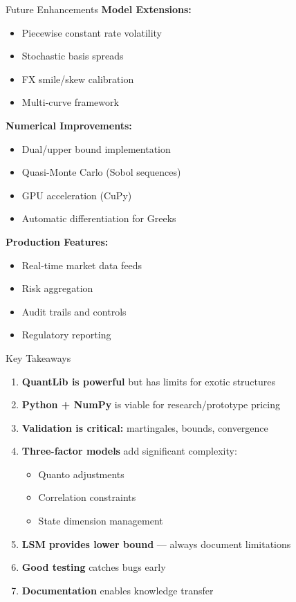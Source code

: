 \documentclass[aspectratio=169,11pt]{beamer}
\begin{document}
\begin{frame}{Future Enhancements}
\textbf{Model Extensions:}
\begin{itemize}
    \item Piecewise constant rate volatility
    \item Stochastic basis spreads
    \item FX smile/skew calibration
    \item Multi-curve framework
\end{itemize}

\textbf{Numerical Improvements:}
\begin{itemize}
    \item Dual/upper bound implementation
    \item Quasi-Monte Carlo (Sobol sequences)
    \item GPU acceleration (CuPy)
    \item Automatic differentiation for Greeks
\end{itemize}

\textbf{Production Features:}
\begin{itemize}
    \item Real-time market data feeds
    \item Risk aggregation
    \item Audit trails and controls
    \item Regulatory reporting
\end{itemize}
\end{frame}

\begin{frame}{Key Takeaways}
\begin{enumerate}
    \item \textbf{QuantLib is powerful} but has limits for exotic structures

    \item \textbf{Python + NumPy} is viable for research/prototype pricing

    \item \textbf{Validation is critical:} martingales, bounds, convergence

    \item \textbf{Three-factor models} add significant complexity:
    \begin{itemize}
        \item Quanto adjustments
        \item Correlation constraints
        \item State dimension management
    \end{itemize}

    \item \textbf{LSM provides lower bound} --- always document limitations

    \item \textbf{Good testing} catches bugs early

    \item \textbf{Documentation} enables knowledge transfer
\end{enumerate}
\end{frame}
\end{document}
